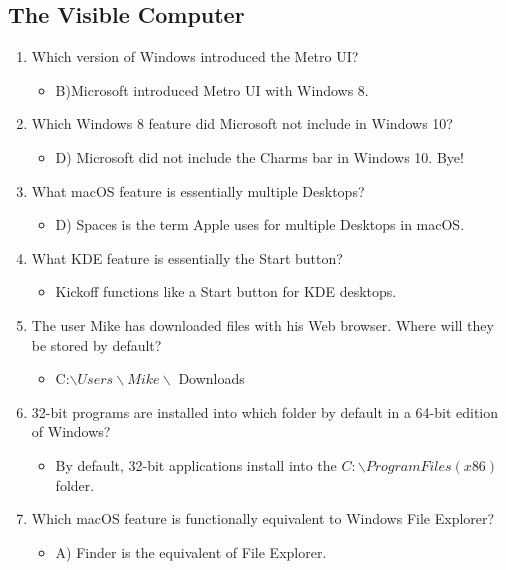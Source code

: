 \documentclass{article}
\begin{document}
\subsection{The Visible Computer}
\begin{enumerate}
    \item Which version of Windows introduced the Metro UI?
    \begin{itemize}
        \item B)Microsoft introduced Metro UI with Windows 8.
    \end{itemize}
    \item Which Windows 8 feature did Microsoft not include in Windows 10?
    \begin{itemize}
        \item D) Microsoft did not include the Charms bar in Windows 10. Bye!
    \end{itemize}
    \item What macOS feature is essentially multiple Desktops?
    \begin{itemize}
        \item D) Spaces is the term Apple uses for multiple Desktops in macOS.
    \end{itemize}
    \item What KDE feature is essentially the Start button?
    \begin{itemize}
        \item Kickoff functions like a Start button for KDE desktops.
    \end{itemize}
    \item The user Mike has downloaded files with his Web browser. Where
will they be stored by default?
    \begin{itemize}
        \item C:$\backslash Users\backslash Mike\backslash$ Downloads
    \end{itemize}
    \item 32-bit programs are installed into which folder by default in a 64-bit
edition of Windows?
    \begin{itemize}
        \item By default, 32-bit applications install into the $C:\backslash Program Files
(x86)$ folder.
    \end{itemize}
    \item Which macOS feature is functionally equivalent to Windows File
Explorer?
    \begin{itemize}
        \item A) Finder is the equivalent of File Explorer.

\end{itemize}
\end{enumerate}
\end{document}
